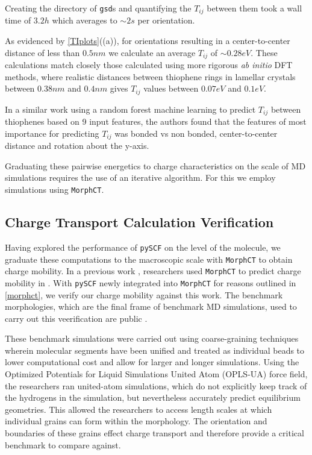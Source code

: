 Creating the directory of \texttt{gsd}s and quantifying the $T_{ij}$ between
them took a wall time of $3.2h$ which averages to ${\sim}2s$ per orientation. 

As evidenced by \autoref{TIplots}((a)), for orientations resulting in a center-to-center distance of less than
$0.5nm$ we calculate an average $T_{ij}$ of ${\sim} 0.28eV$.  
These calculations match closely those
calculated using more rigorous \textit{ab initio} DFT methods\cite{Lan2008},
where realistic distances between thiophene rings in lamellar  crystals 
between $0.38nm$ and $0.4 nm$ gives $T_{ij}$ values between $0.07eV$ and $0.1eV$. 

In a similar work using a random forest machine learning to predict $T_{ij}$
between thiophenes based on 9 input features, the authors found that the
features of most importance for predicting $T_{ij}$ was bonded vs non bonded,
center-to-center distance and rotation about the y-axis. \cite{Jankowski2019c}

Graduating these pairwise energetics to charge characteristics on the scale of MD simulations
requires the use of an iterative algorithm. For this we employ  simulations using \texttt{MorphCT}.

\subsection{Charge Transport Calculation Verification}

Having explored the performance of \texttt{pySCF} on the level of the molecule, we graduate these computations to the
macroscopic scale with \texttt{MorphCT} to obtain charge mobility.
In a previous work \cite{Miller2018}, researchers used \texttt{MorphCT} to predict charge mobility in . 
With \texttt{pySCF} newly integrated into \texttt{MorphCT} for reasons outlined in \autoref{morphct},
we verify our charge mobility against this work.
The benchmark morphologies, which are the final frame of benchmark MD simulations,
used to carry out this veerification are public \cite{P3HTData}. 

These benchmark simulations were carried out using coarse-graining techniques
wherein molecular segments have been unified and treated as individual beads to lower
computational cost and allow for larger and longer simulations. 
Using the Optimized Potentials for Liquid Simulations United Atom (OPLS-UA) force field,
the researchers ran united-atom simulations, which do
not explicitly keep track of the hydrogens in the simulation, 
but nevertheless accurately predict equilibrium geometries. This allowed the researchers to access length scales
at which individual grains can form within the morphology. The orientation and boundaries of these grains effect
charge transport and therefore provide a critical benchmark to compare against. 


